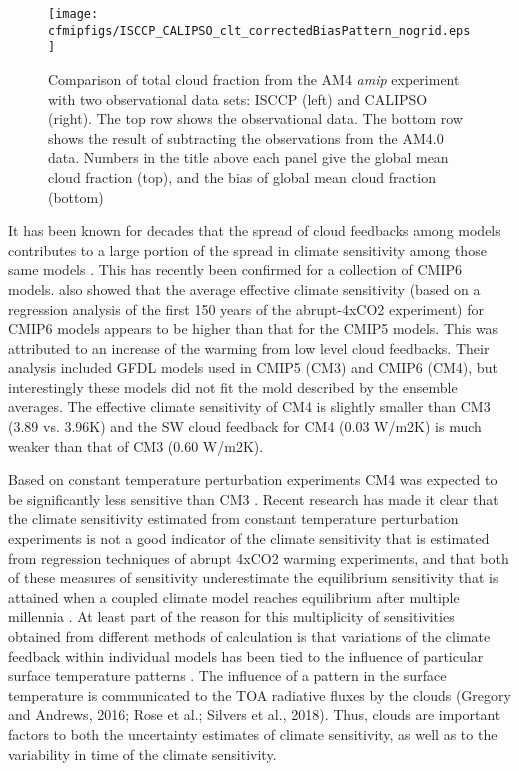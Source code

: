 \documentclass[draft]{agujournal2019}
\begin{document}
\begin{figure}
  \centering
  \texttt{[image: cfmipfigs/ISCCP\_CALIPSO\_clt\_correctedBiasPattern\_nogrid.eps]}
   \caption{Comparison of total cloud fraction from the AM4 \textit{amip} experiment with two observational 
  data sets: ISCCP (left) and CALIPSO (right).  The top row shows the observational data.  The bottom row
  shows the result of subtracting the observations from the AM4.0 data.  Numbers in the title above each 
  panel give the global mean cloud fraction (top), and the bias of global mean cloud fraction (bottom)}
  \label{fig:clt_isccp_calipso}
\end{figure}

It has been known for decades that  the spread of cloud feedbacks among models contributes to a large portion of the 
spread in climate sensitivity among those same models \cite{Cess_etal_1989, Bony_Dufresne_2005}.  
This has recently been confirmed \cite{Zelinka_etal_2020} for a collection of CMIP6 models.   also showed that 
the average effective climate sensitivity (based on a regression analysis of the first 150 years of the abrupt-4xCO2 
experiment) for CMIP6 models appears to be higher than that for the CMIP5 models.  This was attributed to an 
increase of the warming from low level cloud feedbacks.  Their analysis included GFDL models used in CMIP5 (CM3) 
and CMIP6 (CM4), but interestingly
these models did not fit the mold described by the ensemble averages.  The effective climate sensitivity of 
CM4 is slightly smaller than CM3 (3.89 vs. 3.96K) and the SW cloud feedback for CM4 (0.03 W/m2K) is much
weaker than that of CM3 (0.60 W/m2K).  

Based on constant temperature perturbation experiments CM4 was expected to be significantly less sensitive 
than CM3 \cite{Zhao_2014}.
Recent research has made it clear that the climate sensitivity estimated from constant temperature perturbation 
experiments is not a good indicator of the climate sensitivity that is estimated from regression techniques of 
abrupt 4xCO2 warming experiments, and that both 
of these measures of sensitivity underestimate the equilibrium sensitivity that is attained when a coupled climate 
model reaches equilibrium after multiple millennia \cite{Paynter_etal_2018,Rugenstein_etal_2020}.     
At least part of the reason for this multiplicity of 
sensitivities obtained from different methods of calculation is that variations of the climate feedback within 
individual models has been tied to the influence of particular surface temperature patterns 
\cite{Gregory_Andrews_2016, Zhou_etal_2016, Silvers_etal_2018, Andrews_Webb_2018}.   
The influence of a pattern in the surface temperature is communicated to the TOA radiative fluxes by the clouds 
(Gregory and Andrews, 2016; Rose et al.; Silvers et al., 2018).  Thus, clouds are important factors to both the uncertainty 
estimates of climate sensitivity, as well as to the variability in time of the climate sensitivity.  
\end{document}
